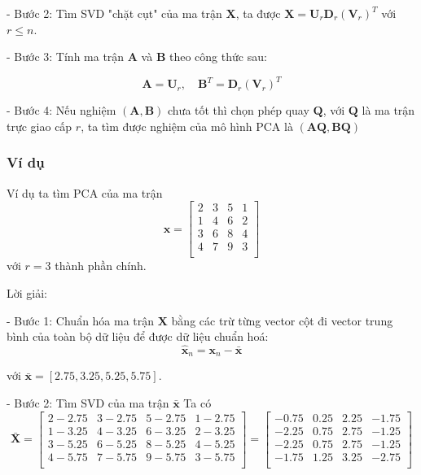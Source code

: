 \documentclass[12pt,a4paper,oneside]{report}
\numberwithin{equation}{section}
\begin{document}
- Bước 2: Tìm SVD "chặt cụt" của ma trận $\mathbf{X}$, ta được $\mathbf{X}=\mathbf{U}_{r} \mathbf{D}_{r}\left(\mathbf{V}_{r}\right)^{T}$ với $r \leq n$.

- Bước 3: Tính ma trận $\mathbf{A}$ và $\mathbf{B}$ theo công thức sau:

$$
\mathbf{A} =  \mathbf{U}_{r}, \quad \mathbf{B}^{T}= \mathbf{D}_{r}\left(\mathbf{V}_{r}\right)^{T}
$$

- Bước 4: Nếu nghiệm $(\mathbf{A, B})$ chưa tốt thì chọn phép quay $\mathbf{Q}$, với $\mathbf{Q}$ là ma trận trực giao cấp $r$, ta tìm được nghiệm của mô hình $\mathrm{PCA}$ là $(\mathbf{A Q, B Q})$

\subsubsection{Ví dụ}
Ví dụ ta tìm PCA của ma trận\[
\mathbf{x} = \begin{bmatrix}
	2 & 3 & 5 & 1 \\
	1 & 4 & 6 & 2 \\
	3 & 6 & 8 & 4 \\
	4 & 7 & 9 & 3 \\
\end{bmatrix}
\] với $r=3$ thành phần chính.

Lời giải:

- Bước 1: Chuẩn hóa ma trận $\mathbf{X}$ bằng các trừ từng vector cột đi vector trung bình của toàn bộ dữ liệu để được dữ
liệu chuẩn hoá:
\begin{equation}
	\hat{\mathbf{x}}_n = \mathbf{x}_n - \bar{\mathbf{x}}
\end{equation}


với $\bar{\mathbf{x}} = \left[ 2.75, 3.25, 5.25, 5.75 \right]$.

- Bước 2: Tìm SVD của ma trận $\bar{\mathbf{x}}$
Ta có
$$
\bar{\mathbf{X}}=\begin{bmatrix}
	2-2.75 & 3-2.75 & 5-2.75 & 1-2.75 \\
	1-3.25 & 4-3.25 & 6-3.25 & 2-3.25 \\
	3-5.25 & 6-5.25 & 8-5.25 & 4-5.25 \\
	4-5.75 & 7-5.75 & 9-5.75 & 3-5.75 \\
\end{bmatrix} = \begin{bmatrix}
	-0.75 & 0.25 & 2.25 & -1.75 \\
	-2.25 & 0.75 & 2.75 & -1.25 \\
	-2.25 & 0.75 & 2.75 & -1.25 \\
	-1.75 & 1.25 & 3.25 & -2.75 \\
\end{bmatrix}
$$
\end{document}

